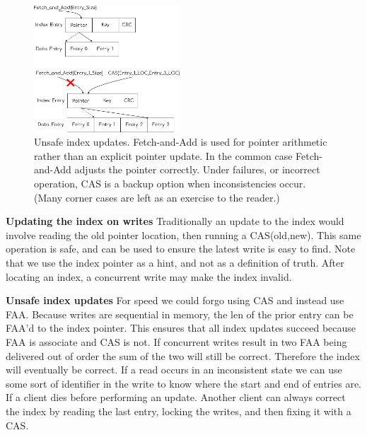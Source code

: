 \begin{figure}[t] \includegraphics[width=0.485\textwidth]{fig/write_updates.pdf}

\caption{ Unsafe index updates. Fetch-and-Add is used for pointer arithmetic
rather than an explicit pointer update. In the common case Fetch-and-Add adjusts
the pointer correctly. Under failures, or incorrect operation, CAS is a backup
option when inconsistencies occur. (Many corner cases are left as an exercise to
the reader.)}

\label{fig:cas_vs_swap}
\end{figure}

\textbf{Updating the index on writes} Traditionally an update to the index would
involve reading the old pointer location, then running a CAS(old,new). This same
operation is safe, and can be used to ensure the latest write is easy to find.
Note that we use the index pointer as a hint, and not as a definition of truth.
After locating an index, a concurrent write may make the index invalid.

\textbf{Unsafe index updates} For speed we could forgo using CAS and instead use
FAA. Because writes are sequential in memory, the len of the prior entry can be
FAA'd to the index pointer. This ensures that all index updates succeed because
FAA is associate and CAS is not. If concurrent writes result in two FAA being
delivered out of order the sum of the two will still be correct. Therefore the
index will eventually be correct. If a read occurs in an inconsistent state we
can use some sort of identifier in the write to know where the start and end of
entries are. If a client dies before performing an update. Another client can
always correct the index by reading the last entry, locking the writes, and then
fixing it with a CAS.